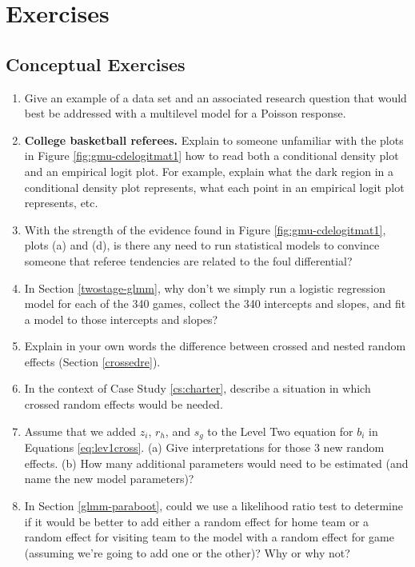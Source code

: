 \documentclass[
]{krantz}
\begin{document}
\section{Exercises}\label{exercises-10}

\subsection{Conceptual Exercises}\label{conceptual-exercises-8}

\begin{enumerate}
\def\labelenumi{\arabic{enumi}.}
\item
  Give an example of a data set and an associated research question that would best be addressed with a multilevel model for a Poisson response.
\item
  \textbf{College basketball referees.} Explain to someone unfamiliar with the plots in Figure \ref{fig:gmu-cdelogitmat1} how to read both a conditional density plot and an empirical logit plot. For example, explain what the dark region in a conditional density plot represents, what each point in an empirical logit plot represents, etc.
\item
  With the strength of the evidence found in Figure \ref{fig:gmu-cdelogitmat1}, plots (a) and (d), is there any need to run statistical models to convince someone that referee tendencies are related to the foul differential?
\item
  In Section \ref{twostage-glmm}, why don't we simply run a logistic regression model for each of the 340 games, collect the 340 intercepts and slopes, and fit a model to those intercepts and slopes?
\item
  Explain in your own words the difference between crossed and nested random effects (Section \ref{crossedre}).
\item
  In the context of Case Study \ref{cs:charter}, describe a situation in which crossed random effects would be needed.
\item
  Assume that we added \(z_{i}\), \(r_{h}\), and \(s_{g}\) to the Level Two equation for \(b_{i}\) in Equations \eqref{eq:lev1cross}. (a) Give interpretations for those 3 new random effects. (b) How many additional parameters would need to be estimated (and name the new model parameters)?
\item
  In Section \ref{glmm-paraboot}, could we use a likelihood ratio test to determine if it would be better to add either a random effect for home team or a random effect for visiting team to the model with a random effect for game (assuming we're going to add one or the other)? Why or why not?

\end{enumerate}
\end{document}

